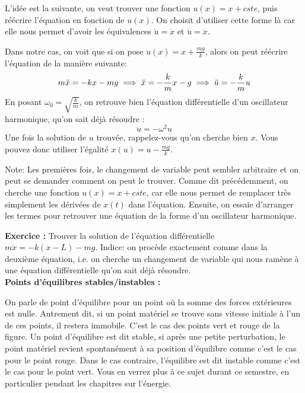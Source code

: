 \documentclass{article}
\begin{document}
\noindent L'idée est la suivante, on veut trouver une fonction $u(x) = x + cste$, puis réécrire l'équation en fonction de $u(x)$. On choisit d'utiliser cette forme là car elle nous permet d'avoir les équivalences $\dot{u} = \dot{x}$ et $\ddot{u} = \ddot{x}.$

\noindent Dans notre cas, on voit que si on pose $u(x) = x + \frac{mg}{k}$, alors on peut réécrire l'équation de la manière suivante:
\[ m \Ddot{x} = -kx - mg \implies \ddot{x} = -\frac{k}{m}x -g \implies \ddot{u} = -\frac{k}{m}u \]
En posant $\omega_0 = \sqrt{\frac{k}{m}}$, on retrouve bien l'équation différentielle d'un oscillateur harmonique, qu'on sait déjà résoudre :  \[ \ddot{u} = -\omega ^2 u \]
Une fois la solution de $u$ trouvée, rappelez-vous qu'on cherche bien $x$. Vous pouvez donc utiliser l'égalité $x(u) = u -\frac{mg}{k}$.

\noindent Note: Les premières fois, le changement de variable peut sembler arbitraire et on peut se demander comment on peut le trouver. Comme dit précédemment, on cherche une fonction $u(x) = x + cste$, car elle nous permet de remplacer très simplement les dérivées de $x(t)$ dans l'équation. Ensuite, on essaie d'arranger les termes pour retrouver une équation de la forme d'un oscillateur harmonique. 

\noindent \textbf{Exercice :} Trouver la solution de l'équation différentielle $m\ddot{x} = -k(x - L) - mg$.
Indice: on procède exactement comme dans la deuxième équation, i.e. on cherche un changement de variable qui nous ramène à une équation différentielle qu'on sait déjà résoudre. \\

\noindent \textbf{Points d'équilibres stables/instables :}
\begin{center}
\end{center}

On parle de point d'équilibre pour un point où la somme des forces extérieures est nulle. Autrement dit, si un point matériel se trouve sans vitesse initiale à l'un de ces points, il restera immobile. C'est le cas des points vert et rouge de la figure. Un point d'équilibre est dit stable, si après une petite perturbation, le point matériel revient spontanément à sa position d'équilibre comme c'est le cas pour le point rouge. Dans le cas contraire, l'équilibre est dit instable comme c'est le cas pour le point vert. Vous en verrez plus à ce sujet durant ce semestre, en particulier pendant les chapitres sur l'énergie.
\end{document}
